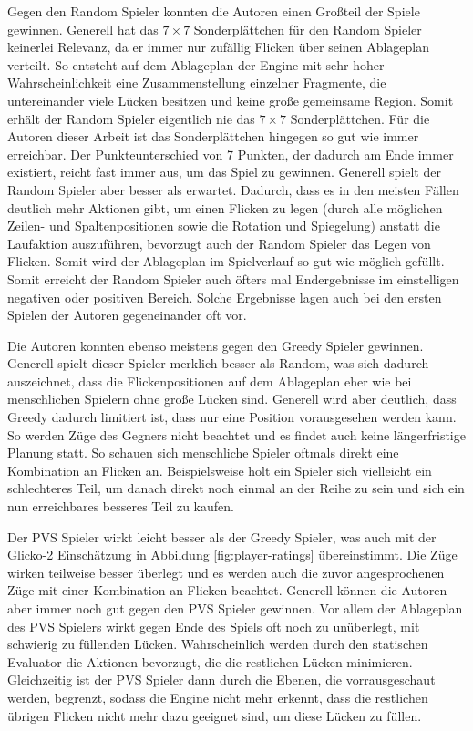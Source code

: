 Gegen den Random Spieler konnten die Autoren einen Großteil der Spiele gewinnen. Generell hat das $7\times 7$ Sonderplättchen für den Random Spieler keinerlei Relevanz, da er immer nur zufällig Flicken über seinen Ablageplan verteilt. So entsteht auf dem Ablageplan der Engine mit sehr hoher Wahrscheinlichkeit eine Zusammenstellung einzelner Fragmente, die untereinander viele Lücken besitzen und keine große gemeinsame Region. Somit erhält der Random Spieler eigentlich nie das $7\times 7$ Sonderplättchen. Für die Autoren dieser Arbeit ist das Sonderplättchen hingegen so gut wie immer erreichbar. Der Punkteunterschied von 7 Punkten, der dadurch am Ende immer existiert, reicht fast immer aus, um das Spiel zu gewinnen. Generell spielt der Random Spieler aber besser als erwartet. Dadurch, dass es in den meisten Fällen deutlich mehr Aktionen gibt, um einen Flicken zu legen (durch alle möglichen Zeilen- und Spaltenpositionen sowie die Rotation und Spiegelung) anstatt die Laufaktion auszuführen, bevorzugt auch der Random Spieler das Legen von Flicken. Somit wird der Ablageplan im Spielverlauf so gut wie möglich gefüllt. Somit erreicht der Random Spieler auch öfters mal Endergebnisse im einstelligen negativen oder positiven Bereich. Solche Ergebnisse lagen auch bei den ersten Spielen der Autoren gegeneinander oft vor.

Die Autoren konnten ebenso meistens gegen den Greedy Spieler gewinnen. Generell spielt dieser Spieler merklich besser als Random, was sich dadurch auszeichnet, dass die Flickenpositionen auf dem Ablageplan eher wie bei menschlichen Spielern ohne große Lücken sind. Generell wird aber deutlich, dass Greedy dadurch limitiert ist, dass nur eine Position vorausgesehen werden kann. So werden Züge des Gegners nicht beachtet und es findet auch keine längerfristige Planung statt. So schauen sich menschliche Spieler oftmals direkt eine Kombination an Flicken an. Beispielsweise holt ein Spieler sich vielleicht ein schlechteres Teil, um danach direkt noch einmal an der Reihe zu sein und sich ein nun erreichbares besseres Teil zu kaufen.

Der \ac{PVS} Spieler wirkt leicht besser als der Greedy Spieler, was auch mit der Glicko-2 Einschätzung in Abbildung \ref{fig:player-ratings} übereinstimmt. Die Züge wirken teilweise besser überlegt und es werden auch die zuvor angesprochenen Züge mit einer Kombination an Flicken beachtet. Generell können die Autoren aber immer noch gut gegen den \ac{PVS} Spieler gewinnen. Vor allem der Ablageplan des \ac{PVS} Spielers wirkt gegen Ende des Spiels oft noch zu unüberlegt, mit schwierig zu füllenden Lücken. Wahrscheinlich werden durch den statischen Evaluator die Aktionen bevorzugt, die die restlichen Lücken minimieren. Gleichzeitig ist der \ac{PVS} Spieler dann durch die Ebenen, die vorrausgeschaut werden, begrenzt, sodass die Engine nicht mehr erkennt, dass die restlichen übrigen Flicken nicht mehr dazu geeignet sind, um diese Lücken zu füllen.

